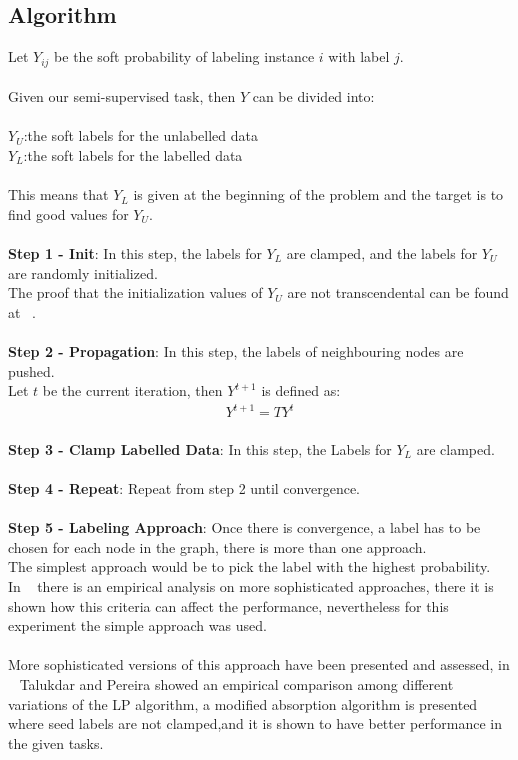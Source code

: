 \documentclass[4pt,a4paper,twocolumn]{article}
\begin{document}
\subsection{Algorithm}
Let $Y_{ij}$ be the soft probability of labeling instance $i$ with label $j$.\\
\\
Given our semi-supervised task, then $Y$ can be divided into:\\
\\
$Y_{U}$:the soft labels for the unlabelled data\\
$Y_{L}$:the soft labels for the labelled data\\
\\
This means that $Y_{L}$ is given at the beginning of the problem
and the target is to find good values for $Y_{U}$.\\
\\
\textbf{Step 1 - Init}: In this step, the labels for $Y_{L}$ are clamped, and the labels for $Y_{U}$ are randomly initialized.\\
The proof that the initialization values of $Y_{U}$ are not transcendental can be found at ~\cite{Zhu:2005:SLG:1104523}.\\
\\
\textbf{Step 2 - Propagation}: In this step, the labels of neighbouring nodes are pushed.\\
Let $t$ be the current iteration, then $Y^{t+1}$ is defined as:
\begin{align}
Y^{t+1} = T Y^{t}
\end{align}
\\
\textbf{Step 3 - Clamp Labelled Data}: In this step, the Labels for $Y_{L}$ are clamped.\\
\\
\textbf{Step 4 - Repeat}: Repeat from step 2 until convergence.\\
\\
\textbf{Step 5 - Labeling Approach}: Once there is convergence, a label has to be chosen for each node in the graph, there is more than one approach.\\
The simplest approach would be to pick the label with the highest probability. \\
In ~\cite{Zhu:2005:SLG:1104523} there is an empirical analysis on more sophisticated approaches, there it is shown how this criteria can affect the performance, nevertheless for this experiment the simple approach was used.\\
\\
More sophisticated versions of this approach have been presented and assessed, in ~\cite{Talukdar:2010:EGS:1858681.1858830} Talukdar and Pereira showed an empirical comparison among different variations of the LP algorithm, a modified absorption algorithm is presented where seed labels are not clamped,and it is shown to have better performance in the given tasks.
\end{document}

